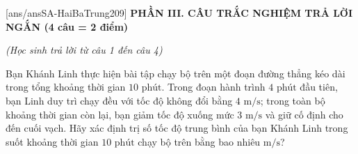 
[ans/ansSA-HaiBaTrung209]
\noindent \textbf{PHẦN III. CÂU TRẮC NGHIỆM TRẢ LỜI NGẮN (4 câu = 2 điểm)}

\noindent \textit{(Học sinh trả lời từ câu 1 đến câu 4)}
\vspace{0.2cm}

\begin{ex}%
	Bạn Khánh Linh thực hiện bài tập chạy bộ trên một đoạn đường thẳng kéo dài trong tổng khoảng thời gian $10\text{ phút}$. Trong đoạn hành trình $4\text{ phút}$ đầu tiên, bạn Linh duy trì chạy đều với tốc độ không đổi bằng $4\text{ m/s}$; trong toàn bộ khoảng thời gian còn lại, bạn giảm tốc độ xuống mức $3\text{ m/s}$ và giữ cố định cho đến cuối vạch. Hãy xác định trị số tốc độ trung bình của bạn Khánh Linh trong suốt khoảng thời gian $10\text{ phút}$ chạy bộ trên bằng bao nhiêu $\text{m/s}$?
\end{ex}

